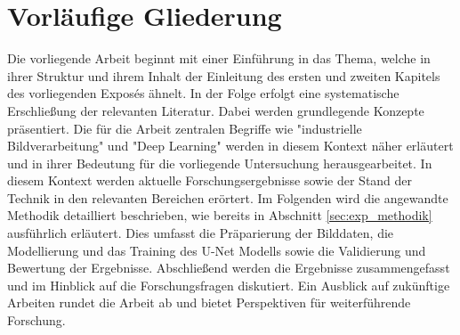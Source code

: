 \chapter{Vorläufige Gliederung}\label{sec:exp_gliederung}
Die vorliegende Arbeit beginnt mit einer Einführung in das Thema, welche in ihrer Struktur und ihrem Inhalt der Einleitung des ersten und zweiten Kapitels des vorliegenden Exposés ähnelt.
In der Folge erfolgt eine systematische Erschließung der relevanten Literatur. Dabei werden grundlegende Konzepte präsentiert. Die für die Arbeit zentralen Begriffe wie "industrielle Bildverarbeitung" und "Deep Learning" werden in diesem Kontext näher erläutert und in ihrer Bedeutung für die vorliegende Untersuchung herausgearbeitet. In diesem Kontext werden aktuelle Forschungsergebnisse sowie der Stand der Technik in den relevanten Bereichen erörtert.
Im Folgenden wird die angewandte Methodik detailliert beschrieben, wie bereits in Abschnitt \ref{sec:exp_methodik} ausführlich erläutert. Dies umfasst die Präparierung der Bilddaten, die Modellierung und das Training des U-Net Modells sowie die Validierung und Bewertung der Ergebnisse.
Abschließend werden die Ergebnisse zusammengefasst und im Hinblick auf die Forschungsfragen diskutiert. Ein Ausblick auf zukünftige Arbeiten rundet die Arbeit ab und bietet Perspektiven für weiterführende Forschung.

